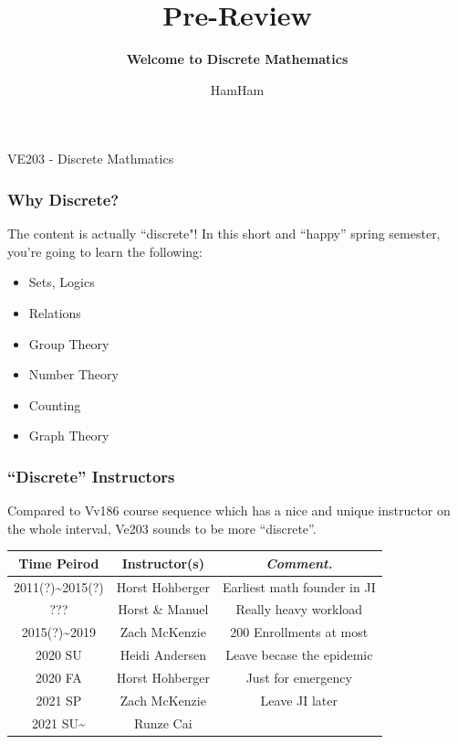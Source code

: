 \documentclass{beamer}
\title{\sffamily Pre-Review }
\subtitle{\textbf{Welcome to Discrete Mathematics}\\}
\institute[UM-SJTU JI]{University of Michigan-Shanghai Jiao Tong University Joint Institute}
\author{HamHam}
\newcommand{\myfont}{\rmfamily\normalsize\upshape\mdseries}
\begin{document}
\begin{titlepage}
    \begin{center}
        VE203 - Discrete Mathmatics 
    \end{center}
\end{titlepage}
\myfont
\begin{frame}
    \frametitle{Why Discrete?}
    \hh The content is actually ``discrete"!
    In this short and “happy” spring semester, you're going to learn the following:
    \vv
    \begin{itemize}
        \item Sets, Logics
        \item Relations
        \item Group Theory
        \item Number Theory
        \item Counting
        \item Graph Theory 
    \end{itemize}
\end{frame}
\begin{frame}
    \frametitle{``Discrete'' Instructors}
    \hh Compared to Vv186 course sequence which has a nice and unique
    instructor on the whole interval, Ve203 sounds to be more ``discrete''.
    \begin{table}[htbp]
        \begin{tabular}{ccc}
        \toprule
        Time Peirod &Instructor(s)  &\textit{Comment.}  \\
        \midrule
        2011(?)\textasciitilde2015(?) &Horst Hohberger  &  Earliest math founder in JI\\
        ??? & Horst \& Manuel & Really heavy workload \\
        2015(?)\textasciitilde2019 &Zach McKenzie  &  200 Enrollments at most\\
        2020 SU &Heidi Andersen  & Leave becase the epidemic\\
        2020 FA& Horst Hohberger & Just for emergency\\
        2021 SP& Zach McKenzie & Leave JI later\\
        2021 SU\textasciitilde & Runze Cai & \\
        \bottomrule
        \end{tabular}
    \end{table}
\end{frame}
\end{document}
